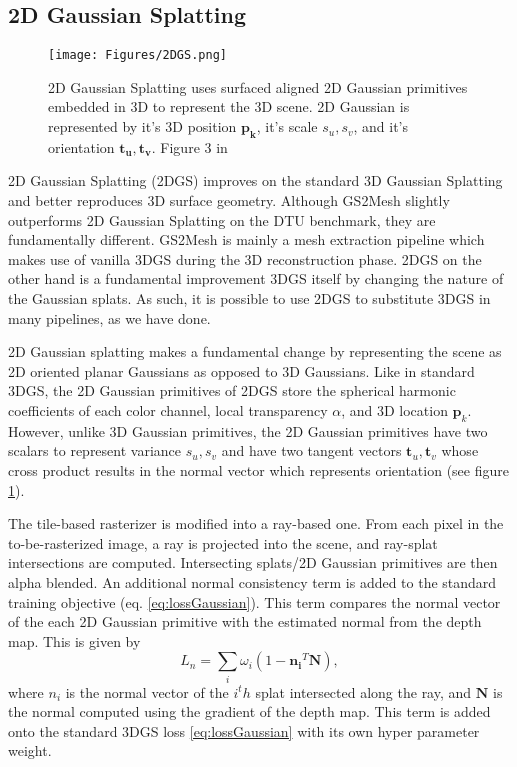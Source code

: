 \subsection{2D Gaussian Splatting}
\begin{figure}[h]
\centering
\texttt{[image: Figures/2DGS.png]}
\caption{2D Gaussian Splatting uses surfaced aligned 2D Gaussian primitives embedded in 3D to represent the 3D scene. 2D Gaussian is represented by it's 3D position $\mathbf{p_k}$, it's scale $s_u, s_v$, and it's orientation $\mathbf{t_u, t_v}$. Figure 3 in \cite{20242dgs}}\label{img:2dgs}
\end{figure}
2D Gaussian Splatting (2DGS) \cite{20242dgs} improves on the standard 3D Gaussian Splatting and better reproduces 3D surface geometry. Although GS2Mesh slightly outperforms 2D Gaussian Splatting on the DTU benchmark, they are fundamentally different. GS2Mesh is mainly a mesh extraction pipeline which makes use of vanilla 3DGS during the 3D reconstruction phase. 2DGS on the other hand is a fundamental improvement 3DGS itself by changing the nature of the Gaussian splats. As such, it is possible to use 2DGS to substitute 3DGS in many pipelines, as we have done.

2D Gaussian splatting makes a fundamental change by representing the scene as 2D oriented planar Gaussians as opposed to 3D Gaussians. Like in standard 3DGS, the 2D Gaussian primitives of 2DGS store the spherical harmonic coefficients of each color channel, local transparency $\alpha$, and 3D location $\mathbf{p}_k$. However, unlike 3D Gaussian primitives, the 2D Gaussian primitives have two scalars to represent variance $s_u, s_v$ and have two tangent vectors $\mathbf{t}_u, \mathbf{t}_v$ whose cross product results in the normal vector which represents orientation (see figure \ref{img:2dgs}). 

The tile-based rasterizer is modified into a ray-based one. From each pixel in the to-be-rasterized image, a ray is projected into the scene, and ray-splat intersections are computed. Intersecting splats/2D Gaussian primitives are then alpha blended. An additional normal consistency term is added to the standard training objective (eq. \ref{eq:lossGaussian}). This term compares the normal vector of the each 2D Gaussian primitive with the estimated normal from the depth map. This is given by 
\begin{equation}
L_n = \sum_i \omega_i (1-\mathbf{n_i}^T \mathbf{N}),
\end{equation}
where $n_i$ is the normal vector of the $i^th$ splat intersected along the ray, and $\mathbf{N}$ is the normal computed using the gradient of the depth map. This term is added onto the standard 3DGS loss \ref{eq:lossGaussian} with its own hyper parameter weight.

